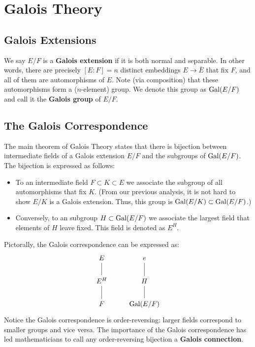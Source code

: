 \section{Galois Theory}

\subsection{Galois Extensions}

We say $E/F$ is a \textbf{Galois extension} if it is both normal and separable. In other words, there are precisely $[E : F] = n$ distinct embeddings $E \to \bar{E}$ that fix $F$, and all of them are automorphisms of $E$. Note (via composition) that these automorphisms form a ($n$-element) group. We denote this group as $\operatorname{Gal}(E/F)$ and call it the \textbf{Galois group} of $E/F$.

\subsection{The Galois Correspondence}

The main theorem of Galois Theory states that there is bijection between intermediate fields of a Galois extension $E/F$ and the subgroups of $\operatorname{Gal}(E/F)$. The bijection is expressed as follows:
\begin{itemize}
    \item To an intermediate field $F \subset K \subset E$ we associate the subgroup of all automorphisms that fix $K$. (From our previous analysis, it is not hard to show $E/K$ is a Galois extension. Thus, this group is $\operatorname{Gal}(E/K) \subset \operatorname{Gal}(E/F)$.)
    \item Conversely, to an subgroup $H \subset \operatorname{Gal}(E/F)$ we associate the largest field that elements of $H$ leave fixed. This field is denoted as $E^H$.
\end{itemize}

Pictorally, the Galois correspondence can be expressed as:
\[
    \begin{tikzcd}
        E \arrow[d, no head]   & e \arrow[d, no head] \\
        E^H \arrow[d, no head] & H \arrow[d, no head] \\
        F                      & \Gal(E/F)           
    \end{tikzcd}
\]
Notice the Galois correspondence is order-reversing: larger fields correspond to smaller groups and vice versa. The importance of the Galois correspondence has led mathematicians to call any order-reversing bijection a \textbf{Galois connection}.

